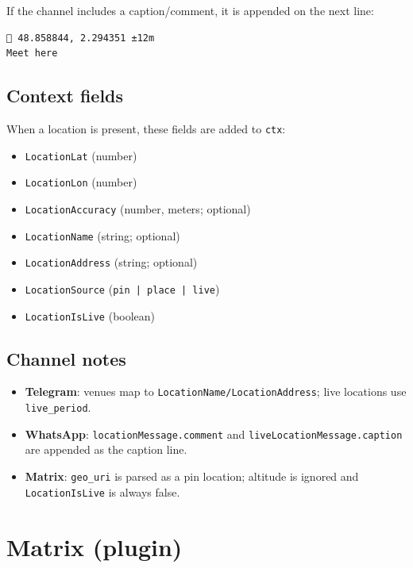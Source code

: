 If the channel includes a caption/comment, it is appended on the next line:

\begin{lstlisting}
📍 48.858844, 2.294351 ±12m
Meet here
\end{lstlisting}


\subsection{Context fields}


When a location is present, these fields are added to \texttt{ctx}:

\begin{itemize}
  \item \texttt{LocationLat} (number)
  \item \texttt{LocationLon} (number)
  \item \texttt{LocationAccuracy} (number, meters; optional)
  \item \texttt{LocationName} (string; optional)
  \item \texttt{LocationAddress} (string; optional)
  \item \texttt{LocationSource} (\texttt{pin | place | live})
  \item \texttt{LocationIsLive} (boolean)
\end{itemize}


\subsection{Channel notes}


\begin{itemize}
  \item \textbf{Telegram}: venues map to \texttt{LocationName/LocationAddress}; live locations use \texttt{live\_period}.
  \item \textbf{WhatsApp}: \texttt{locationMessage.comment} and \texttt{liveLocationMessage.caption} are appended as the caption line.
  \item \textbf{Matrix}: \texttt{geo\_uri} is parsed as a pin location; altitude is ignored and \texttt{LocationIsLive} is always false.
\end{itemize}



\clearpage

\section{Matrix (plugin)}


